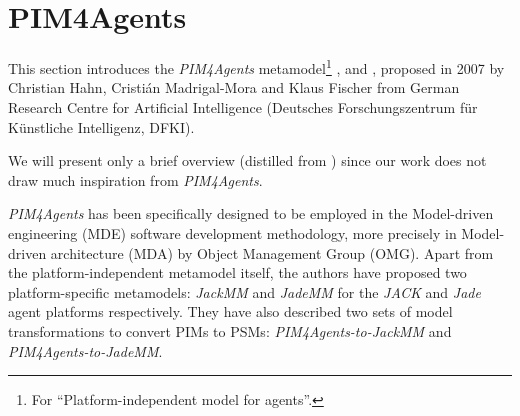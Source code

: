 
\section{PIM4Agents}

This section introduces the \textit{PIM4Agents} metamodel\footnote{For ``Platform-independent model for agents''.} \cite{Hahn07a}, \cite{Hahn07b} and \cite{Hahn08}, proposed in 2007 by Christian Hahn, Cristián Madrigal-Mora and Klaus Fischer from German Research Centre for Artificial Intelligence (Deutsches Forschungszentrum f\"{u}r K\"{u}nstliche Intelligenz, DFKI).

We will present only a brief overview (distilled from \cite{Hahn07b}) since our work does not draw much inspiration from \textit{PIM4Agents}.


\textit{PIM4Agents} has been specifically designed to be employed in the Model-driven engineering (MDE) software development methodology, more precisely in Model-driven architecture (MDA) by Object Management Group (OMG).
Apart from the platform-independent metamodel itself, the authors have proposed two platform-specific metamodels: \textit{JackMM} and \textit{JadeMM} for the \textit{JACK} and \textit{Jade} agent platforms respectively.
They have also described two sets of model transformations to convert PIMs to PSMs: \textit{PIM4Agents-to-JackMM} and \textit{PIM4Agents-to-JadeMM}.

